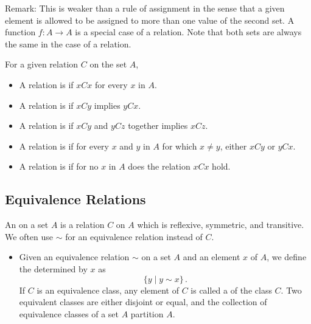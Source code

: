 Remark: This is weaker than a rule of assignment in the sense 
that a given element is allowed to be assigned to more than one 
value of the second set. A function $f:A \to A$ is a special case 
of a relation. Note that both sets are always the same 
in the case of a relation.

For a given relation $C$ on the set $A$, 
\begin{itemize}
	\item A relation is  
	if $xCx$ for every $x$ in $A$.
	
	\item A relation is  
	if $xCy$ implies $yCx$.
	
	\item A relation is 
	 if $xCy$ and $yCz$ 
	together implies $xCz$.
	
	\item A relation is 
	 if for every $x$ 
	and $y$ in $A$ for which $x \neq y$, either $xCy$ or $yCx$.
	
	\item A relation is 
	 if for no $x$ 
	in $A$ does the relation $xCx$ hold.
\end{itemize}


\subsection{Equivalence Relations}\label{eq 
relation properties}

\begin{definition}
	An  on a 
	set $A$ is a relation $C$ on $A$ which is reflexive, 
	symmetric, and transitive. We often use $\sim$ for an 
	equivalence relation instead of $C$.
\end{definition}

\begin{itemize}
	\item Given an equivalence relation $\sim$ on a set $A$ and 
	an element $x$ of $A$, we define the  determined by $x$ as
	\[
		\{ y \mid y \sim x \}\,.
	\]
	If $C$ is an equivalence class, any element of $C$ is called a  of the class $C$.
	Two equivalent classes are either disjoint or equal, and the 
	collection of equivalence classes of a set $A$ partition $A$.
\end{itemize}

